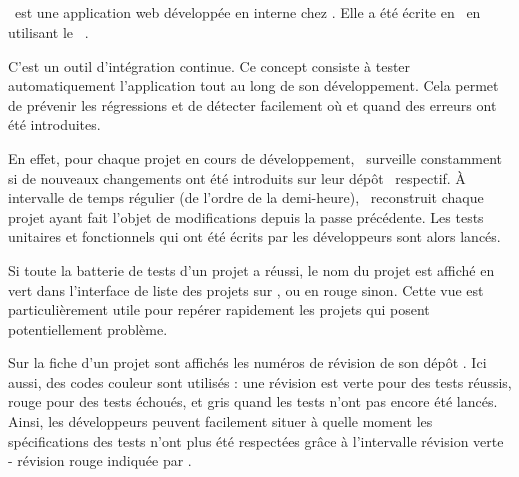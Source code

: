 \subsection{\asismo}
\label{section:sismo}

\asismo\ est une application web développée en interne chez \asl. Elle a été écrite en \aphp\ en utilisant le \afm\ \asf.

C'est un outil d'intégration continue. Ce concept consiste à tester automatiquement l'application tout au long de son développement. Cela permet de prévenir les régressions et de détecter facilement où et quand des erreurs ont été introduites.

En effet, pour chaque projet en cours de développement, \asismo\ surveille constamment si de nouveaux changements ont été introduits sur leur dépôt \asvn\ respectif. À intervalle de temps régulier (de l'ordre de la demi-heure), \asismo\ reconstruit chaque projet ayant fait l'objet de modifications depuis la passe précédente. Les tests unitaires et fonctionnels qui ont été écrits par les développeurs sont alors lancés.

Si toute la batterie de tests d'un projet a réussi, le nom du projet est affiché en vert dans l'interface de liste des projets sur \asismo, ou en rouge sinon. Cette vue est particulièrement utile pour repérer rapidement les projets qui posent potentiellement problème.

Sur la fiche d'un projet sont affichés les numéros de révision de son dépôt \asvn. Ici aussi, des codes couleur sont utilisés : une révision est verte pour des tests réussis, rouge pour des tests échoués, et gris quand les tests n'ont pas encore été lancés. Ainsi, les développeurs peuvent facilement situer à quelle moment les spécifications des tests n'ont plus été respectées grâce à l'intervalle révision verte - révision rouge indiquée par \asismo.
